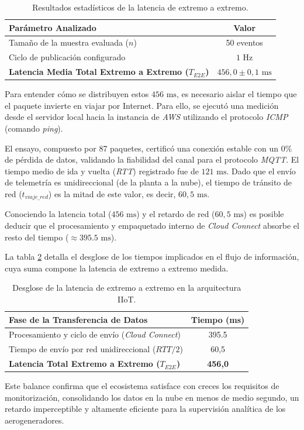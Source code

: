 \begin{table}[b]
\centering
\caption{Resultados estadísticos de la latencia de extremo a extremo.}
\label{tab:estadistica_e2e}
\begin{tabular}{p{10.5cm}c}
\toprule
\textbf{Parámetro Analizado} & \textbf{Valor} \\
\midrule
Tamaño de la muestra evaluada ($n$) & 50 eventos \\
Ciclo de publicación configurado & $1\text{ Hz}$ \\
\midrule
\textbf{Latencia Media Total Extremo a Extremo ($T_{E2E}$)} & \textbf{$456,0 \pm 0,1\text{ ms}$} \\
\bottomrule
\end{tabular}
\end{table}

Para entender cómo se distribuyen estos $456\text{ ms}$, es necesario aislar el tiempo que el paquete invierte en viajar por Internet. Para ello, se ejecutó una medición desde el servidor local hacia la instancia de \textit{AWS} utilizando el protocolo \textit{ICMP} (comando \textit{ping}).

El ensayo, compuesto por 87 paquetes, certificó una conexión estable con un $0\%$ de pérdida de datos, validando la fiabilidad del canal para el protocolo \textit{MQTT}. El tiempo medio de ida y vuelta (\textit{RTT}) registrado fue de $121\text{ ms}$. Dado que el envío de telemetría es unidireccional (de la planta a la nube), el tiempo de tránsito de red ($t_{viaje\_red}$) es la mitad de este valor, es decir, $60,5\text{ ms}$.

Conociendo la latencia total ($456\text{ ms}$) y el retardo de red ($60,5\text{ ms}$)  es posible deducir que el procesamiento y empaquetado interno de \textit{Cloud Connect} absorbe el resto del tiempo ($\approx 395.5\text{ ms}$).

La tabla \ref{tab:resumen_latencia_e2e} detalla el desglose de los tiempos implicados en el flujo de información, cuya suma compone la latencia de extremo a extremo medida.

\begin{table}[tbp]
\centering
\caption{Desglose de la latencia de extremo a extremo en la arquitectura IIoT.}
\label{tab:resumen_latencia_e2e}
\begin{tabular}{p{10.5cm}c}
\toprule
\textbf{Fase de la Transferencia de Datos} & \textbf{Tiempo (ms)} \\
\midrule
Procesamiento y ciclo de envío (\textit{Cloud Connect}) & 395.5 \\
Tiempo de envío por red unidireccional ($RTT / 2$) & 60,5 \\
\midrule
\textbf{Latencia Total Extremo a Extremo ($T_{E2E}$)} & \textbf{456,0} \\
\bottomrule
\end{tabular}
\end{table}

Este balance confirma que el ecosistema satisface con creces los requisitos de monitorización, consolidando los datos en la nube en menos de medio segundo, un retardo imperceptible y altamente eficiente para la supervisión analítica de los aerogeneradores.

